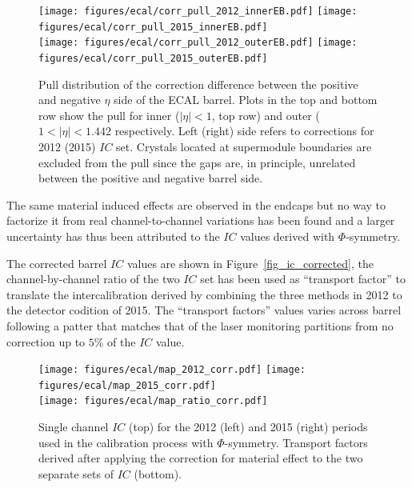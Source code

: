 \begin{figure}[h!]
  \centering
  \texttt{[image: figures/ecal/corr\_pull\_2012\_innerEB.pdf]}
  \texttt{[image: figures/ecal/corr\_pull\_2015\_innerEB.pdf]}\\
  \texttt{[image: figures/ecal/corr\_pull\_2012\_outerEB.pdf]}
  \texttt{[image: figures/ecal/corr\_pull\_2015\_outerEB.pdf]}
  \caption{Pull distribution of the correction difference between the positive and negative $\eta$ side of the ECAL barrel.
    Plots in the top and bottom row show the pull for inner ($|\eta| < 1$, top row) and outer ($1 < |\eta| < 1.442$
    respectively. Left (right) side refers to corrections for 2012 (2015) $IC$ set. Crystals located at supermodule
    boundaries are excluded from the pull since the gaps are, in principle, unrelated between the positive and negative
  barrel side.}
  \label{fig:correction_pull}
\end{figure}


The same material induced effects are observed in the endcaps but no way to factorize it from real channel-to-channel
variations has been found and a larger uncertainty has thus been attributed to the $IC$ values derived with $\Phi$-symmetry.

The corrected barrel $IC$ values are shown in Figure~\ref{fig_ic_corrected},
the channel-by-channel ratio of the two $IC$ set %
has been used as ``transport factor'' to translate the intercalibration
derived by combining the three methods in 2012 to the detector codition of 2015.
The ``transport factors'' values varies across barrel following a patter that matches that of the laser monitoring
partitions from no correction up to $5\%$ of the $IC$ value. %

\begin{figure}[h!]
  \centering
  \texttt{[image: figures/ecal/map\_2012\_corr.pdf]}
  \texttt{[image: figures/ecal/map\_2015\_corr.pdf]}\\
  \texttt{[image: figures/ecal/map\_ratio\_corr.pdf]}  
  \caption{Single channel $IC$ (top) for the 2012 (left) and 2015 (right) periods used in the calibration process with
    $\Phi$-symmetry. Transport factors derived after applying the correction for material effect to the two
    separate sets of $IC$ (bottom).}
  \label{fig:ic_corrected}
\end{figure}

